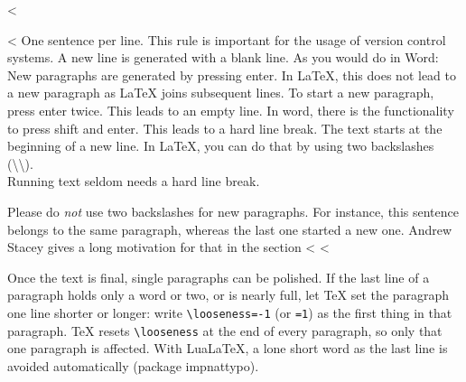 <%

<%
One sentence per line.
This rule is important for the usage of version control systems.
A new line is generated with a blank line.
As you would do in Word:
New paragraphs are generated by pressing enter.
In LaTeX, this does not lead to a new paragraph as LaTeX joins subsequent lines.
To start a new paragraph, press enter twice.
This leads to an empty line.
In word, there is the functionality to press shift and enter.
This leads to a hard line break.
The text starts at the beginning of a new line.
In LaTeX, you can do that by using two backslashes (\textbackslash\textbackslash).
\\
Running text seldom needs a hard line break.

Please do \textit{not} use two backslashes for new paragraphs.
For instance, this sentence belongs to the same paragraph, whereas the last one started a new one.
Andrew Stacey gives a long motivation for that in the section <%
<%

Once the text is final, single paragraphs can be polished.
If the last line of a paragraph holds only a word or two, or is nearly full, let TeX set the paragraph one line shorter or longer: write \texttt{\textbackslash looseness=-1} (or \texttt{=1}) as the first thing in that paragraph.
TeX resets \texttt{\textbackslash looseness} at the end of every paragraph, so only that one paragraph is affected.
With LuaLaTeX, a lone short word as the last line is avoided automatically (package impnattypo).
